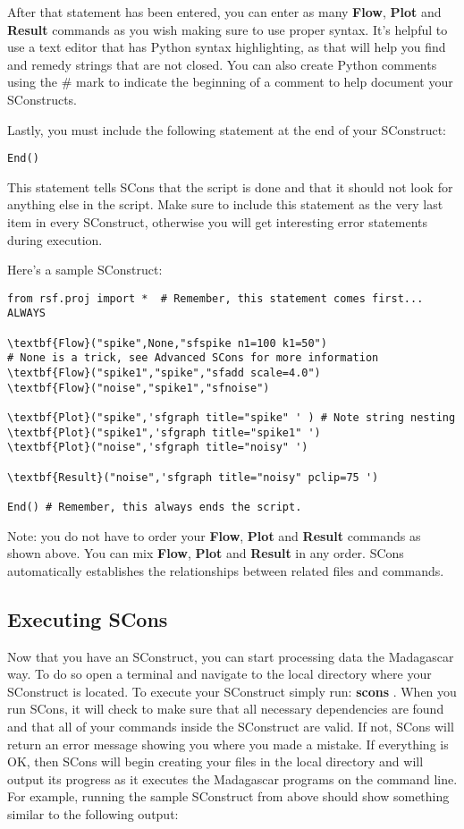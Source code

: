After that statement has been entered, you can enter as many \textbf{Flow}, \textbf{Plot} and \textbf{Result} commands as you wish making sure to use proper syntax.  It's helpful to use a text editor that has Python syntax highlighting, as that will help you find and remedy strings that are not closed.  You can also create Python comments using the $\#$ mark to indicate the beginning of a comment to help document your SConstructs.

Lastly, you must include the following statement at the end of your SConstruct:
\begin{verbatim}
End()
\end{verbatim}
This statement tells SCons that the script is done and that it should not look for anything else in the script.  Make sure to include this statement as the very last item in every SConstruct, otherwise you will get interesting error statements during execution.  

Here's a sample SConstruct:
\begin{verbatim}
from rsf.proj import *  # Remember, this statement comes first... ALWAYS

\textbf{Flow}("spike",None,"sfspike n1=100 k1=50") 
# None is a trick, see Advanced SCons for more information
\textbf{Flow}("spike1","spike","sfadd scale=4.0")
\textbf{Flow}("noise","spike1","sfnoise")

\textbf{Plot}("spike",'sfgraph title="spike" ' ) # Note string nesting
\textbf{Plot}("spike1",'sfgraph title="spike1" ') 
\textbf{Plot}("noise",'sfgraph title="noisy" ')

\textbf{Result}("noise",'sfgraph title="noisy" pclip=75 ')

End() # Remember, this always ends the script.
\end{verbatim}
Note: you do not have to order your \textbf{Flow}, \textbf{Plot} and \textbf{Result} commands as shown above.  You can mix \textbf{Flow}, \textbf{Plot} and \textbf{Result} in any order.  SCons automatically establishes the relationships between related files and commands.

\subsection{Executing SCons}

Now that you have an SConstruct, you can start processing data the Madagascar way.  To do so open a terminal and navigate to the local directory where your SConstruct is located.  To execute your SConstruct simply run: \textbf{scons} .  When you run SCons, it will check to make sure that all necessary dependencies are found and that all of your commands inside the SConstruct are valid.  If not, SCons will return an error message showing you where you made a mistake.  If everything is OK, then SCons will begin creating your files in the local directory and will output its progress as it executes the Madagascar programs on the command line.  For example, running the sample SConstruct from above should show something similar to the following output:

